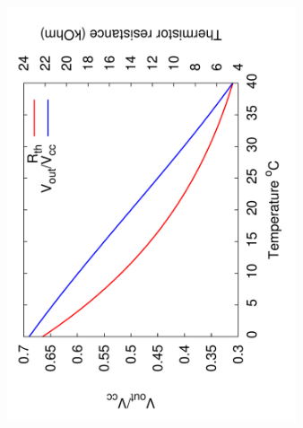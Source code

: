 \documentclass[beamer]{standalone}
\begin{document}
{\begin{columns}[c]
\begin{column}{.25\textwidth}
	\end{column}
	\begin{column}{.75\textwidth}
		\begin{figure}
			\includegraphics[angle=-90,width=0.80\textwidth]{./plots/thermistor_linearized.pdf}
		\end{figure}
	\end{column}
\end{columns}
	}
	
\end{document}
